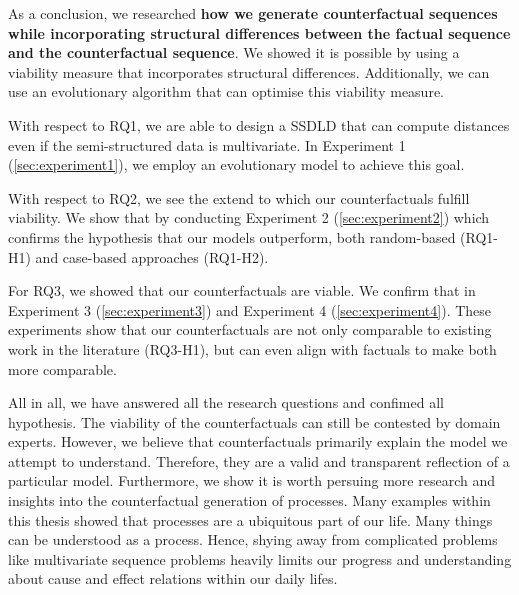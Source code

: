 \documentclass[./../../paper.tex]{subfiles}
\begin{document}
As a conclusion, we researched \textbf{how we generate counterfactual sequences while incorporating structural differences between the factual sequence and the counterfactual sequence}. We showed it is possible by using a viability measure that incorporates structural differences. Additionally, we can use an evolutionary algorithm that can optimise this viability measure. 

With respect to RQ1\footnotemark[1], we are able to design a \Gls{SSDLD} that can compute distances even if the semi-structured data is multivariate. In Experiment 1 (\autoref{sec:experiment1}), we employ an evolutionary model to achieve this goal.

With respect to RQ2\footnotemark[2], we see the extend to which our counterfactuals fulfill viability. 
We show that by conducting Experiment 2 (\autoref{sec:experiment2}) which confirms the hypothesis that our models outperform, both random-based (RQ1-H1) and case-based approaches (RQ1-H2).  

For RQ3\footnotemark[3], we showed that our counterfactuals are viable. 
We confirm that in Experiment 3 (\autoref{sec:experiment3}) and Experiment 4 (\autoref{sec:experiment4}).
These experiments show that our counterfactuals are not only comparable to existing work in the literature (RQ3-H1), but can even align with factuals to make both more comparable.

All in all, we have answered all the research questions and confimed all hypothesis. The viability of the counterfactuals can still be contested by domain experts. However, we believe that counterfactuals primarily explain the model we attempt to understand. Therefore, they are a valid and transparent reflection of a particular model. Furthermore, we show it is worth persuing more research and insights into the counterfactual generation of processes. Many examples within this thesis showed that processes are a ubiquitous part of our life. Many things can be understood as a process. Hence, shying away from complicated problems like multivariate sequence problems heavily limits our progress and understanding about cause and effect relations within our daily lifes. 

\end{document}
